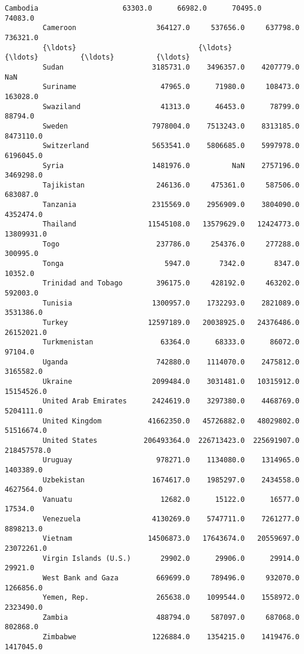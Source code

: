 \documentclass[11pt]{article}
\begin{document}
\begin{Verbatim}[commandchars=\\\{\}]
         Cambodia                    63303.0      66982.0      70495.0      74083.0   
         Cameroon                   364127.0     537656.0     637798.0     736321.0   
         {\ldots}                             {\ldots}          {\ldots}          {\ldots}          {\ldots}   
         Sudan                     3185731.0    3496357.0    4207779.0          NaN   
         Suriname                    47965.0      71980.0     108473.0     163028.0   
         Swaziland                   41313.0      46453.0      78799.0      88794.0   
         Sweden                    7978004.0    7513243.0    8313185.0    8473110.0   
         Switzerland               5653541.0    5806685.0    5997978.0    6196045.0   
         Syria                     1481976.0          NaN    2757196.0    3469298.0   
         Tajikistan                 246136.0     475361.0     587506.0     683087.0   
         Tanzania                  2315569.0    2956909.0    3804090.0    4352474.0   
         Thailand                 11545108.0   13579629.0   12424773.0   13809931.0   
         Togo                       237786.0     254376.0     277288.0     300995.0   
         Tonga                        5947.0       7342.0       8347.0      10352.0   
         Trinidad and Tobago        396175.0     428192.0     463202.0     592003.0   
         Tunisia                   1300957.0    1732293.0    2821089.0    3531386.0   
         Turkey                   12597189.0   20038925.0   24376486.0   26152021.0   
         Turkmenistan                63364.0      68333.0      86072.0      97104.0   
         Uganda                     742880.0    1114070.0    2475812.0    3165582.0   
         Ukraine                   2099484.0    3031481.0   10315912.0   15154526.0   
         United Arab Emirates      2424619.0    3297380.0    4468769.0    5204111.0   
         United Kingdom           41662350.0   45726882.0   48029802.0   51516674.0   
         United States           206493364.0  226713423.0  225691907.0  218457578.0   
         Uruguay                    978271.0    1134080.0    1314965.0    1403389.0   
         Uzbekistan                1674617.0    1985297.0    2434558.0    4627564.0   
         Vanuatu                     12682.0      15122.0      16577.0      17534.0   
         Venezuela                 4130269.0    5747711.0    7261277.0    8898213.0   
         Vietnam                  14506873.0   17643674.0   20559697.0   23072261.0   
         Virgin Islands (U.S.)       29902.0      29906.0      29914.0      29921.0   
         West Bank and Gaza         669699.0     789496.0     932070.0    1266856.0   
         Yemen, Rep.                265638.0    1099544.0    1558972.0    2323490.0   
         Zambia                     488794.0     587097.0     687068.0     802868.0   
         Zimbabwe                  1226884.0    1354215.0    1419476.0    1417045.0   
         

\end{Verbatim}
\end{document}
